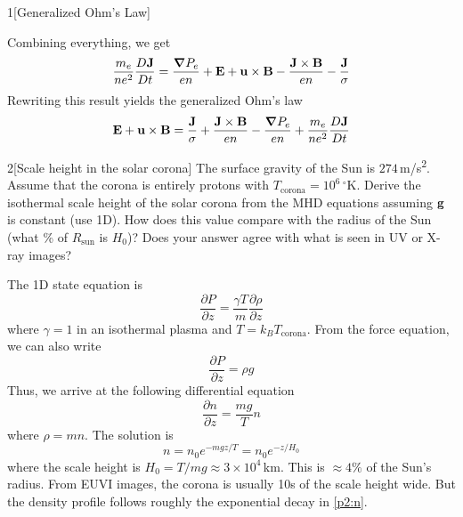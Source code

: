 \documentclass[12pt]{article}
\begin{document}
\begin{problem}{1}[Generalized Ohm's Law]
\begin{solution}
Combining everything, we get
\begin{equation}
    \frac{m_e}{ne^2}\frac{D\vb{J}}{Dt}
    =\frac{\grad
    P_e}{en}+\vb{E}+\vb{u}\times\vb{B}-\frac{\vb{J}\times\vb{B}}{en}-\frac{\vb{J}}{\sigma}
\end{equation}
Rewriting this result yields the generalized Ohm's law
\begin{equation}
    \vb{E}+\vb{u}\times\vb{B}=\frac{\vb{J}}{\sigma}+\frac{\vb{J}\times\vb{B}}{en}-\frac{\grad
    P_e}{en}+\frac{m_e}{ne^2}\frac{D\vb{J}}{Dt} 
\end{equation}
\end{solution}
\end{problem}

\begin{problem}{2}[Scale height in the solar corona]
The surface gravity of the Sun is $274$\,\si{m/s\tothe{2}}. Assume that the
corona is entirely protons with $T_{\text{corona}}=10^6$\,$^\circ$\si{K}.
Derive the isothermal scale height of the solar corona from the MHD equations
assuming $\vb{g}$ is constant (use 1D). How does this value compare with the
radius of the Sun (what \% of $R_{\text{sun}}$ is $H_0$)? Does your answer agree
with what is seen in UV or X-ray images?
\begin{solution}
The 1D state equation is
\begin{equation}
    \frac{\partial P}{\partial z}
    =\frac{\gamma T}{m}\frac{\partial\rho}{\partial z} 
\end{equation}
where $\gamma=1$ in an isothermal plasma and $T=k_BT_{\text{corona}}$. From the 
force equation, we can also write
\begin{equation}
    \frac{\partial P}{\partial z}=\rho g 
\end{equation}
Thus, we arrive at the following differential equation
\begin{equation}
    \frac{\partial n}{\partial z}=\frac{mg}{T}n 
\end{equation}
where $\rho=mn$. The solution is
\begin{equation}\label{p2:n}
    n=n_0e^{-mgz/T}=n_0e^{-z/H_0}
\end{equation}
where the scale height is $H_0=T /mg\approx 3\times 10^{4}$\,\si{km}. This is
$\approx 4\%$ of the Sun's radius. From EUVI images, the corona is usually 10s
of the scale height wide. But the density profile follows roughly the
exponential decay in \eqref{p2:n}.
\end{solution}
\end{problem}
\end{document}
